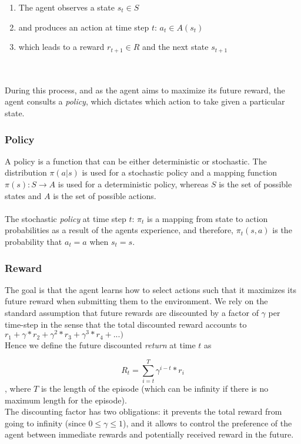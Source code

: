 \begin{enumerate}
    \item The agent observes a state $s_t \in S$
    \item and produces an action at time step $t$: $a_t \in A(s_t)$
    \item which leads to a reward $r_{t+1} \in R$ and the next state $s_{t+1}$
\end{enumerate}
\\
\\
During this process, and as the agent aims to maximize its future reward, the agent consults a \textit{policy}, which dictates which action to take given a particular state.

\subsubsection{Policy}

A policy is a function that can be either deterministic or stochastic. 
The distribution $\pi(a|s)$ is used for a stochastic policy and a mapping function $\pi(s) : S \rightarrow A$ is used for a deterministic policy, whereas $S$ is the set of possible states and $A$ is the set of possible actions.
\\
\\
The stochastic \textit{policy} at time step $t$: $\pi_t$ is a mapping from state to action probabilities as a result of the agents experience, and therefore, $\pi_t(s, a)$ is the probability that $a_t=a$ when $s_t=s$.

\subsubsection{Reward}

The goal is that the agent learns how to select actions such that it maximizes its future reward when submitting them to the environment.
We rely on the standard assumption that future rewards are discounted by a factor of $\gamma$ per time-step in the sense that the total discounted reward accounts to $r_1 + \gamma*r_2 + \gamma^2*r_3 + \gamma^3*r_4 + ...)$
\\
Hence we define the future discounted \textit{return} at time $t$ as 

\begin{equation}
R_t=\sum_{i=t}^{T}{\gamma^{i-t}{*}r_{i}}
\end{equation}
, where $T$ is the length of the episode (which can be infinity if there is no maximum length for the episode).
\\
The discounting factor has two obligations: it prevents the total reward from going to infinity (since $0 \leq \gamma \leq 1$), and it allows to control the preference of the agent between immediate rewards and potentially received reward in the future. \cite{rl-demysitifed2}

